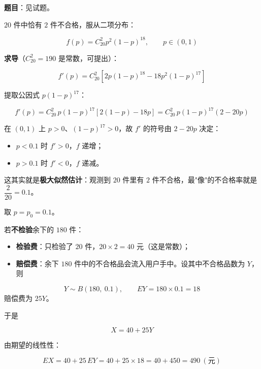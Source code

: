 \par\medskip


\textbf{题目}：见试题。


$20$ 件中恰有 $2$ 件不合格，服从二项分布：

\[f(p)=C_{20}^{2}p^{2}(1-p)^{18},\qquad p\in(0,1)\]

\textbf{求导}（$C_{20}^{2}=190$ 是常数，可提出）：

\[f'(p)=C_{20}^{2}\left[2p(1-p)^{18}-18p^{2}(1-p)^{17}\right]\]

提取公因式 $p(1-p)^{17}$：

\[f'(p)=C_{20}^{2}\,p(1-p)^{17}\left[2(1-p)-18p\right]=C_{20}^{2}\,p(1-p)^{17}(2-20p)\]

在 $(0,1)$ 上 $p>0$、$(1-p)^{17}>0$，故 $f'$ 的符号由 $2-20p$ 决定：

\begin{itemize}
\item $p<0.1$ 时 $f'>0$，$f$ 递增；
\item $p>0.1$ 时 $f'<0$，$f$ 递减。
\end{itemize}


\begin{gktip}
这其实就是\textbf{极大似然估计}：观测到 $20$ 件里有 $2$ 件不合格，最"像"的不合格率就是 $\dfrac2{20}=0.1$。
\end{gktip}


取 $p=p_0=0.1$。


若\textbf{不检验}余下的 $180$ 件：

\begin{itemize}
\item \textbf{检验费}：只检验了 $20$ 件，$20\times2=40$ 元（这是常数）；
\item \textbf{赔偿费}：余下 $180$ 件中的不合格品会流入用户手中。设其中不合格品数为 $Y$，则
\end{itemize}
\[Y\sim B(180,\ 0.1),\qquad EY=180\times0.1=18\]
  赔偿费为 $25Y$。

于是

\[X=40+25Y\]

由期望的线性性：

\[EX=40+25\,EY=40+25\times18=40+450=490\ (\text{元})\]

